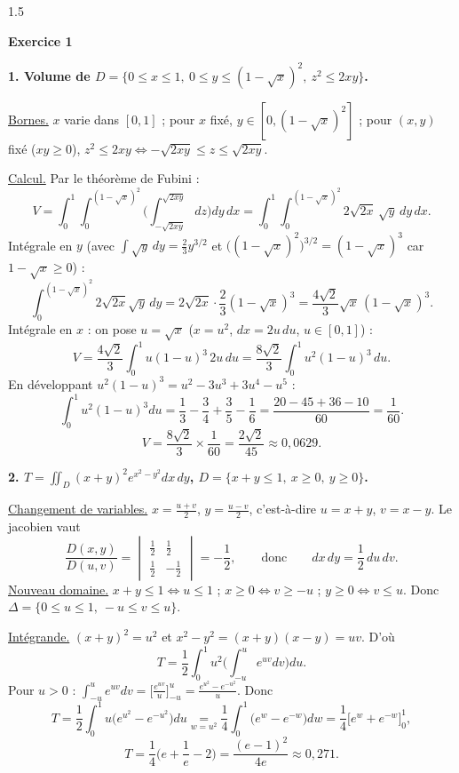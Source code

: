 \documentclass[12pt]{article}
\begin{document}
\begin{spacing}{1.5}

\textbf{Exercice 1}

\textbf{1. Volume de $D=\{0\le x\le1,\ 0\le y\le(1-\sqrt x)^2,\ z^2\le2xy\}$.}

\underline{Bornes.} $x$ varie dans $[0,1]$ ; pour $x$ fixé, $y\in[0,(1-\sqrt x)^2]$ ; pour $(x,y)$ fixé ($xy\ge0$), $z^2\le2xy\iff-\sqrt{2xy}\le z\le\sqrt{2xy}$.

\underline{Calcul.} Par le théorème de Fubini :
\[
V=\int_0^1\int_0^{(1-\sqrt x)^2}\Big(\int_{-\sqrt{2xy}}^{\sqrt{2xy}}dz\Big)dy\,dx=\int_0^1\int_0^{(1-\sqrt x)^2}2\sqrt{2x}\,\sqrt y\,dy\,dx .
\]
Intégrale en $y$ (avec $\int\sqrt y\,dy=\frac23y^{3/2}$ et $\big((1-\sqrt x)^2\big)^{3/2}=(1-\sqrt x)^3$ car $1-\sqrt x\ge0$) :
\[
\int_0^{(1-\sqrt x)^2}2\sqrt{2x}\sqrt y\,dy=2\sqrt{2x}\cdot\frac23(1-\sqrt x)^3=\frac{4\sqrt2}{3}\sqrt x\,(1-\sqrt x)^3 .
\]
Intégrale en $x$ : on pose $u=\sqrt x$ ($x=u^2$, $dx=2u\,du$, $u\in[0,1]$) :
\[
V=\frac{4\sqrt2}{3}\int_0^1u(1-u)^3\,2u\,du=\frac{8\sqrt2}{3}\int_0^1u^2(1-u)^3\,du .
\]
En développant $u^2(1-u)^3=u^2-3u^3+3u^4-u^5$ :
\[
\int_0^1u^2(1-u)^3du=\frac13-\frac34+\frac35-\frac16=\frac{20-45+36-10}{60}=\frac1{60}.
\]
\[
\boxed{V=\frac{8\sqrt2}{3}\times\frac1{60}=\frac{2\sqrt2}{45}\approx0{,}0629}.
\]

\textbf{2. $T=\displaystyle\iint_D(x+y)^2e^{x^2-y^2}dx\,dy$, $D=\{x+y\le1,\ x\ge0,\ y\ge0\}$.}

\underline{Changement de variables.} $x=\frac{u+v}{2}$, $y=\frac{u-v}{2}$, c'est-à-dire $u=x+y$, $v=x-y$. Le jacobien vaut
\[
\frac{D(x,y)}{D(u,v)}=\begin{vmatrix}\frac12&\frac12\\[1mm]\frac12&-\frac12\end{vmatrix}=-\frac12,\qquad\text{donc}\qquad dx\,dy=\frac12\,du\,dv .
\]
\underline{Nouveau domaine.} $x+y\le1\iff u\le1$ ; $x\ge0\iff v\ge-u$ ; $y\ge0\iff v\le u$. Donc $\Delta=\{0\le u\le1,\ -u\le v\le u\}$.

\underline{Intégrande.} $(x+y)^2=u^2$ et $x^2-y^2=(x+y)(x-y)=uv$. D'où
\[
T=\frac12\int_0^1u^2\Big(\int_{-u}^ue^{uv}dv\Big)du .
\]
Pour $u>0$ : $\displaystyle\int_{-u}^ue^{uv}dv=\Big[\frac{e^{uv}}{u}\Big]_{-u}^u=\frac{e^{u^2}-e^{-u^2}}{u}$. Donc
\[
T=\frac12\int_0^1u\big(e^{u^2}-e^{-u^2}\big)du\underset{w=u^2}{=}\frac14\int_0^1\big(e^w-e^{-w}\big)dw=\frac14\Big[e^w+e^{-w}\Big]_0^1,
\]
\[
\boxed{T=\frac14\Big(e+\frac1e-2\Big)=\frac{(e-1)^2}{4e}\approx0{,}271}.
\]


\end{spacing}
\end{document}
